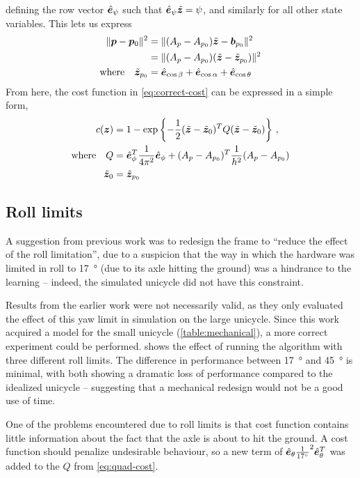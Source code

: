\documentclass[main.tex]{subfiles}
\begin{document}
	defining the row vector $\hat{\bm{e}}_{\psi}$ such that $\hat{\bm{e}}_{\psi}\tilde{\bm{z}} = \psi$, and similarly for all other state variables.
	This lets us express
	\begin{align}
		\|\bm{p} - \bm{p}_0\|^2
			&= \|(A_p - A_{p_0})\tilde{\bm{z}} - \bm{b}_{p_0}\|^2  \nonumber \\
			&= \|(A_p - A_{p_0})(\tilde{\bm{z}} - \tilde{\bm{z}}_{p_0})\|^2 \\
		\text{where}\quad\tilde{\bm{z}}_{p_0}
			&= \hat{\bm{e}}_{\cos \beta} + \hat{\bm{e}}_{\cos \alpha} + \hat{\bm{e}}_{\cos \theta}  \nonumber
	\end{align}
	From here, the cost function in \cref{eq:correct-cost} can be expressed in a simple form,
	\begin{align}
		c(\bm z) &= 1 - \exp\left\{-\frac{1}{2}
			(\tilde{\bm{z}} - \tilde{\bm{z}}_0)^T  Q (\tilde{\bm{z}} - \tilde{\bm{z}}_0)
		\right\} \,, \label{eq:quad-cost} \\
		\text{where}\quad Q &=
			\hat{\bm{e}}_{\phi}^T\frac{1}{4\pi^2}\hat{\bm{e}}_{\phi} +
			(A_p - A_{p_0})^T\frac{1}{h^2}(A_p - A_{p_0}) \nonumber \\
			\tilde{\bm{z}}_0 &= \tilde{\bm{z}}_{p_0} \nonumber
	\end{align}

\subsection{Roll limits}
	A suggestion from previous work was to redesign the frame to \enquote{reduce the effect of the roll limitation}\cite[p.~35]{aleksi}, due to a suspicion that the way in which the hardware was limited in roll to \SI{17}{\degree} (due to its axle hitting the ground) was a hindrance to the learning -- indeed, the simulated unicycle did not have this constraint.

	Results from the earlier work were not necessarily valid, as they only evaluated the effect of this yaw limit in simulation on the large unicycle.
	Since this work acquired a model for the small unicycle (\cref{table:mechanical}), a more correct experiment could be performed.
	 shows the effect of running the algorithm with three different roll limits.
	The difference in performance between \SI{17}{\degree} and \SI{45}{\degree} is minimal, with both showing a dramatic loss of performance compared to the idealized unicycle -- suggesting that a mechanical redesign would not be a good use of time.

	One of the problems encountered due to roll limits is that cost function contains little information about the fact that the axle is about to hit the ground.
	A cost function should penalize undesirable behaviour, so a new term of $\hat{\bm{e}}_{\theta}\frac{1}{\SI{17}{\degree}}^2\hat{\bm{e}}_{\theta}^T$ was added to the $Q$ from \cref{eq:quad-cost}.
\end{document}

